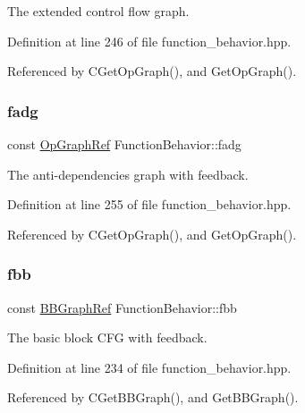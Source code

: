 The extended control flow graph. 



Definition at line 246 of file function\+\_\+behavior.\+hpp.



Referenced by C\+Get\+Op\+Graph(), and Get\+Op\+Graph().

\mbox{\label{classFunctionBehavior_ae8d7948c9e13d74d24cb0f0d5ea33985}} 
\subsubsection{\texorpdfstring{fadg}{fadg}}
{\footnotesize\ttfamily const \hyperlink{op__graph_8hpp_aee97c95c40f791b60c451d9e29c72d39}{Op\+Graph\+Ref} Function\+Behavior\+::fadg\hspace{0.3cm}{\ttfamily [private]}}



The anti-\/dependencies graph with feedback. 



Definition at line 255 of file function\+\_\+behavior.\+hpp.



Referenced by C\+Get\+Op\+Graph(), and Get\+Op\+Graph().

\mbox{\label{classFunctionBehavior_aeed6d388455b5859bd4d84ff7a8f60e5}} 
\subsubsection{\texorpdfstring{fbb}{fbb}}
{\footnotesize\ttfamily const \hyperlink{basic__block_8hpp_a0e7f233d1b83cad0bfd5aa865f0d3532}{B\+B\+Graph\+Ref} Function\+Behavior\+::fbb\hspace{0.3cm}{\ttfamily [private]}}



The basic block C\+FG with feedback. 



Definition at line 234 of file function\+\_\+behavior.\+hpp.



Referenced by C\+Get\+B\+B\+Graph(), and Get\+B\+B\+Graph().

